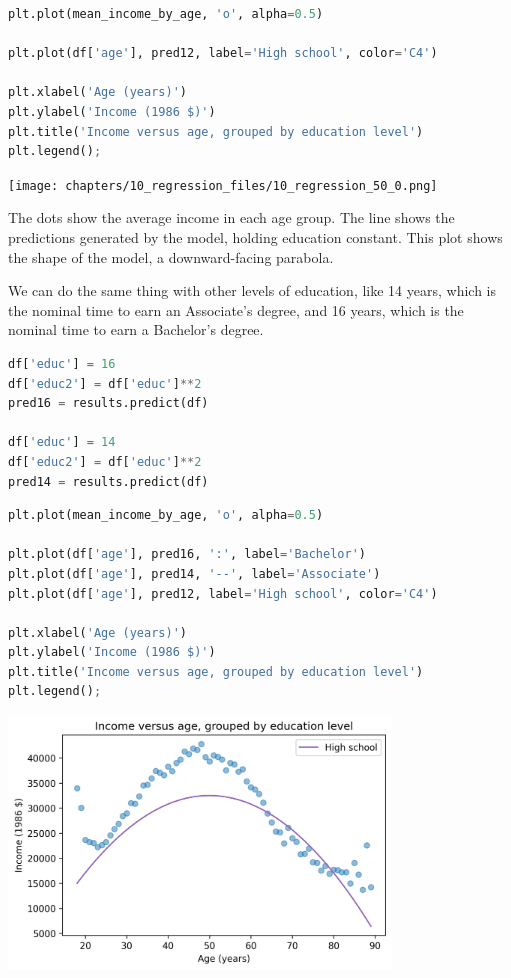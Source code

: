 \begin{lstlisting}[language=Python,style=source]
plt.plot(mean_income_by_age, 'o', alpha=0.5)

plt.plot(df['age'], pred12, label='High school', color='C4')

plt.xlabel('Age (years)')
plt.ylabel('Income (1986 $)')
plt.title('Income versus age, grouped by education level')
plt.legend();
\end{lstlisting}

\begin{center}
\texttt{[image: chapters/10\_regression\_files/10\_regression\_50\_0.png]}
\end{center}

The dots show the average income in each age group. The line shows the
predictions generated by the model, holding education constant. This
plot shows the shape of the model, a downward-facing parabola.

We can do the same thing with other levels of education, like 14 years,
which is the nominal time to earn an Associate's degree, and 16 years,
which is the nominal time to earn a Bachelor's degree.

\begin{lstlisting}[language=Python,style=source]
df['educ'] = 16
df['educ2'] = df['educ']**2
pred16 = results.predict(df)

df['educ'] = 14
df['educ2'] = df['educ']**2
pred14 = results.predict(df)
\end{lstlisting}

\begin{lstlisting}[language=Python,style=source]
plt.plot(mean_income_by_age, 'o', alpha=0.5)

plt.plot(df['age'], pred16, ':', label='Bachelor')
plt.plot(df['age'], pred14, '--', label='Associate')
plt.plot(df['age'], pred12, label='High school', color='C4')

plt.xlabel('Age (years)')
plt.ylabel('Income (1986 $)')
plt.title('Income versus age, grouped by education level')
plt.legend();
\end{lstlisting}

\begin{center}
\includegraphics[width=4in]{chapters/10_regression_files/10_regression_53_0.png}
\end{center}


